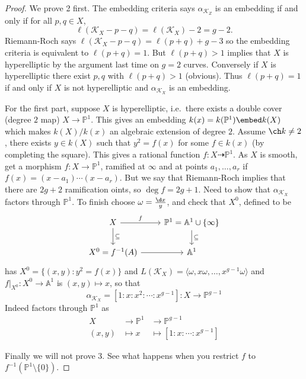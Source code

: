 \documentclass[a4paper]{article}
\renewcommand{\A}{\mathbb{A}}
\renewcommand*{\P}{\mathbb{P}}
\newcommand{\rational}{\dashrightarrow} %
\begin{document}
\begin{proof}
  We prove 2 first. The embedding criteria says \(\alpha_{\mathcal K_Z}\) is an embedding if and only if for all \(p, q \in X\),
  \[
    \ell(\mathcal K_X - p - q) = \ell(\mathcal K_X) - 2 = g - 2.
  \]
  Riemann-Roch says \(\ell(\mathcal K_X - p - q) = \ell(p + q) + g - 3\) so the embedding criteria is equivalent to \(\ell(p + q) = 1\). But \(\ell(p + q) > 1\) implies that \(X\) is hyperelliptic by the argument last time on \(g = 2\) curves. Conversely if \(X\) is hyperelliptic there exist \(p, q\) with \(\ell(p + q) > 1\) (obvious). Thus \(\ell(p + q) = 1\) if and only if \(X\) is not hyperelliptic and \(\alpha_{\mathcal K_X}\) is an embedding.

  For the first part, suppose \(X\) is hyperelliptic, i.e.\ there exists a double cover (degree \(2\) map) \(X \to \P^1\). This gives an embedding \(k(x) = k(\P^1) \embed k(X)\) which makes \(k(X)/k(x)\) an algebraic extension of degree \(2\). Assume \(\ch k \neq 2\), there exists \(y \in k(X)\) such that \(y^2 = f(x)\) for some \(f \in k(x)\) (by completing the square). This gives a rational function \(f: X \rational \P^1\). As \(X\) is smooth, get a morphism \(f: X \to \P^1\), ramified at \(\infty\) and at points \(a_1, \dots, a_r\) if \(f(x) = (x - a_1) \cdots (x - a_r)\). But we say that Riemann-Roch implies that there are \(2g + 2\) ramification oints, so \(\deg f = 2g + 1\). Need to show that \(\alpha_{\mathcal K_X}\) factors through \(\P^1\). To finish choose \(\omega = \frac{\d x}{y}\), and check that \(X^0\), defined to be
  \[
    \begin{tikzcd}
      X \ar[r, "f"] \ar[d, "\subseteq"] & \P^1 = \A^1 \cup \{\infty\} \ar[d, "\subseteq"] \\
      X^0 = f^{-1}(A) \ar[r] & \A^1
    \end{tikzcd}
  \]
  has \(X^0 = \{(x, y): y^2 = f(x)\}\) and \(L(\mathcal K_X) = \langle \omega, x\omega, \dots, x^{g - 1} \omega \rangle\) and \(f|_{X^0}: X^0 \to \A^1\) is \((x, y) \mapsto x\), so that
  \[
    \alpha_{\mathcal K_X} = [1:x:x^2:\cdots:x^{g - 1}]: X \to \P^{g - 1}
  \]
  Indeed factors through \(\P^1\) as
  \begin{align*}
    X &\to \P^1 &\to \P^{g - 1} \\
    (x, y) &\mapsto x &\mapsto [1:x: \cdots : x^{g - 1}]
  \end{align*}

  Finally we will not prove 3. See what happens when you restrict \(f\) to \(f^{-1}(\P^1 \setminus \{0\})\).
\end{proof}
\end{document}
